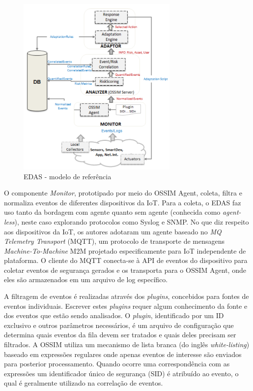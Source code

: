 \documentclass[tid,table]{texufpel} %
\begin{document}
\begin{figure}[ht]
\centering
\includegraphics[width=0.7\textwidth]{imagens/edas-reference-model.png}
\caption{EDAS - modelo de referência}
\label{edas-reference-model}
\end{figure}

O componente \textit{Monitor}, prototipado por meio do OSSIM Agent, coleta, filtra e normaliza eventos de diferentes dispositivos da IoT. Para a coleta, o EDAS faz uso tanto da bordagem com agente quanto sem agente (conhecida como \textit{agent-less}), neste caso explorando protocolos como Syslog e SNMP. No que diz respeito aos dispositivos da IoT, os autores adotaram um agente baseado no \textit{MQ Telemetry Transport} (MQTT), um protocolo de transporte de mensagens \textit{Machine-To-Machine} M2M projetado especificamente para IoT independente de plataforma. O cliente do MQTT conecta-se à API de eventos do dispositivo para coletar eventos de segurança gerados e os transporta para o OSSIM Agent, onde eles são armazenados em um arquivo de log específico.

A filtragem de eventos é realizadas através dos \textit{plugins}, concebidos para fontes de eventos individuais. Escrever estes \textit{plugins} requer algum conhecimento da fonte e dos eventos que estão sendo analisados. O \textit{plugin}, identificado por um ID exclusivo e outros parâmetros necessários, é um arquivo de configuração que determina quais eventos da fila devem ser tratados e quais deles precisam ser filtrados. A OSSIM utiliza um mecanismo de lista branca (do inglês \textit{white-listing}) baseado em expressões regulares onde apenas eventos de interesse são enviados para posterior processamento. Quando ocorre uma correspondência com as expressões um identificador único de segurança (SID) é atribuído ao evento, o qual é geralmente utilizado na correlação de eventos.
\end{document}
